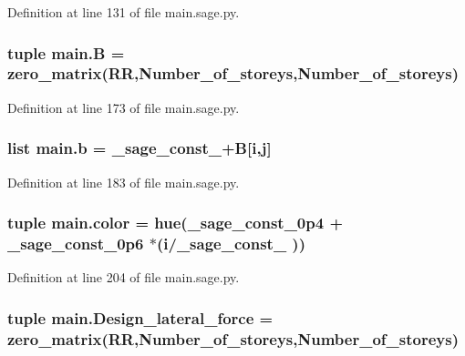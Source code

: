 Definition at line 131 of file main.\+sage.\+py.

\hypertarget{a00039_a6ae8768d11174f5baf9febc5244d6f06}{}
\subsubsection[{B}]{\setlength{\rightskip}{0pt plus 5cm}tuple main.\+B = zero\+\_\+matrix(R\+R,Number\+\_\+of\+\_\+storeys,Number\+\_\+of\+\_\+storeys)}\label{a00039_a6ae8768d11174f5baf9febc5244d6f06}


Definition at line 173 of file main.\+sage.\+py.

\hypertarget{a00039_ab1e783015bffd2e1d395a9099143d967}{}
\subsubsection[{b}]{\setlength{\rightskip}{0pt plus 5cm}list main.\+b = \+\_\+sage\+\_\+const\+\_+{\bf B}\mbox{[}{\bf i},{\bf j}\mbox{]}}\label{a00039_ab1e783015bffd2e1d395a9099143d967}


Definition at line 183 of file main.\+sage.\+py.

\hypertarget{a00039_aeabbf69db1809807f065c2d1e9a62567}{}
\subsubsection[{color}]{\setlength{\rightskip}{0pt plus 5cm}tuple main.\+color = hue(\+\_\+sage\+\_\+const\+\_\+0p4 + \+\_\+sage\+\_\+const\+\_\+0p6 $\ast$({\bf i}/\+\_\+sage\+\_\+const\+\_ ))}\label{a00039_aeabbf69db1809807f065c2d1e9a62567}


Definition at line 204 of file main.\+sage.\+py.

\hypertarget{a00039_a35df7d294c439792977f174dd5b04ec1}{}
\subsubsection[{Design\+\_\+lateral\+\_\+force}]{\setlength{\rightskip}{0pt plus 5cm}tuple main.\+Design\+\_\+lateral\+\_\+force = zero\+\_\+matrix(R\+R,Number\+\_\+of\+\_\+storeys,Number\+\_\+of\+\_\+storeys)}\label{a00039_a35df7d294c439792977f174dd5b04ec1}


